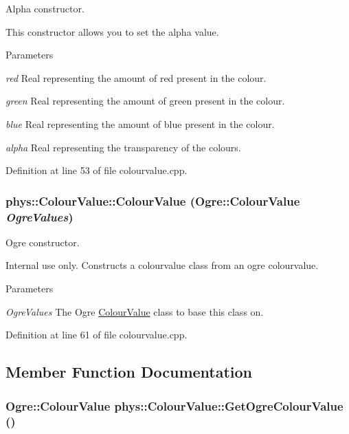 Alpha constructor. 

This constructor allows you to set the alpha value. 
\begin{DoxyParams}{Parameters}
\item[{\em red}]Real representing the amount of red present in the colour. \item[{\em green}]Real representing the amount of green present in the colour. \item[{\em blue}]Real representing the amount of blue present in the colour. \item[{\em alpha}]Real representing the transparency of the colours. \end{DoxyParams}


Definition at line 53 of file colourvalue.cpp.

\hypertarget{classphys_1_1ColourValue_a8a004962cde5fd3063dd845be4256fa9}{
\subsubsection[{ColourValue}]{\setlength{\rightskip}{0pt plus 5cm}phys::ColourValue::ColourValue (Ogre::ColourValue {\em OgreValues})}}
\label{d3/db0/classphys_1_1ColourValue_a8a004962cde5fd3063dd845be4256fa9}


Ogre constructor. 

Internal use only. Constructs a colourvalue class from an ogre colourvalue. 
\begin{DoxyParams}{Parameters}
\item[{\em OgreValues}]The Ogre \hyperlink{classphys_1_1ColourValue}{ColourValue} class to base this class on. \end{DoxyParams}


Definition at line 61 of file colourvalue.cpp.



\subsection{Member Function Documentation}
\hypertarget{classphys_1_1ColourValue_a7a2978ebc5a7e04e02279664f1ea4a86}{
\subsubsection[{GetOgreColourValue}]{\setlength{\rightskip}{0pt plus 5cm}Ogre::ColourValue phys::ColourValue::GetOgreColourValue ()}}
\label{d3/db0/classphys_1_1ColourValue_a7a2978ebc5a7e04e02279664f1ea4a86}


